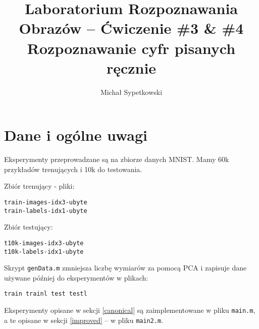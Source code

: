 \documentclass[a4paper]{article}
\begin{document}
\title{ Laboratorium Rozpoznawania Obrazów – Ćwiczenie \#3 \& \#4 Rozpoznawanie cyfr pisanych ręcznie }


\author{Michał Sypetkowski}
\maketitle










\section{Dane i ogólne uwagi}
Eksperymenty przeprowadzane są na zbiorze danych MNIST. 
Mamy 60k przykładów trenujących i 10k do testowania.

Zbiór trenujący - pliki:
\begin{verbatim}
train-images-idx3-ubyte
train-labels-idx1-ubyte
\end{verbatim}

Zbiór testujący:
\begin{verbatim}
t10k-images-idx3-ubyte
t10k-labels-idx1-ubyte
\end{verbatim}

Skrypt \texttt{genData.m} zmniejsza liczbę wymiarów za pomocą PCA
i zapisuje dane używane później do eksperymentów w plikach:
\begin{verbatim}
train trainl test testl
\end{verbatim}

Eksperymenty opisane w sekcji \ref{canonical} są zaimplementowane w pliku \texttt{main.m},
a te opisane w sekcji \ref{improved} -- w pliku \texttt{main2.m}.
\end{document}
